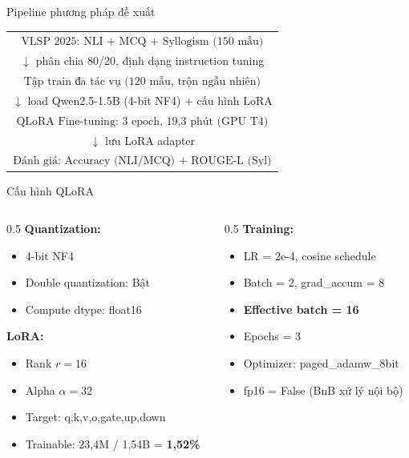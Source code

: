 \documentclass{beamer}
\begin{document}
\begin{frame}{Pipeline phương pháp đề xuất}
  \begin{center}
  \begin{tabular}{c}
    $\boxed{\text{VLSP 2025: NLI + MCQ + Syllogism (150 mẫu)}}$ \\[0.2cm]
    $\downarrow$ \small phân chia 80/20, định dạng instruction tuning\\[0.2cm]
    $\boxed{\text{Tập train đa tác vụ (120 mẫu, trộn ngẫu nhiên)}}$ \\[0.2cm]
    $\downarrow$ \small load Qwen2.5-1.5B (4-bit NF4) + cấu hình LoRA\\[0.2cm]
    $\boxed{\text{QLoRA Fine-tuning: 3 epoch, 19,3 phút (GPU T4)}}$ \\[0.2cm]
    $\downarrow$ \small lưu LoRA adapter\\[0.2cm]
    $\boxed{\text{Đánh giá: Accuracy (NLI/MCQ) + ROUGE-L (Syl)}}$
  \end{tabular}
  \end{center}
\end{frame}

\begin{frame}{Cấu hình QLoRA}
  \begin{columns}
    \begin{column}{0.5\textwidth}
      \textbf{Quantization:}
      \begin{itemize}
        \item 4-bit NF4
        \item Double quantization: Bật
        \item Compute dtype: float16
      \end{itemize}
      \textbf{LoRA:}
      \begin{itemize}
        \item Rank $r = 16$
        \item Alpha $\alpha = 32$
        \item Target: q,k,v,o,gate,up,down
        \item Trainable: 23,4M / 1,54B = \textbf{1,52\%}
      \end{itemize}
    \end{column}
    \begin{column}{0.5\textwidth}
      \textbf{Training:}
      \begin{itemize}
        \item LR = 2e-4, cosine schedule
        \item Batch = 2, grad\_accum = 8
        \item \textbf{Effective batch = 16}
        \item Epochs = 3
        \item Optimizer: paged\_adamw\_8bit
        \item fp16 = False (BnB xử lý nội bộ)
      \end{itemize}
    \end{column}
  \end{columns}
\end{frame}
\end{document}
